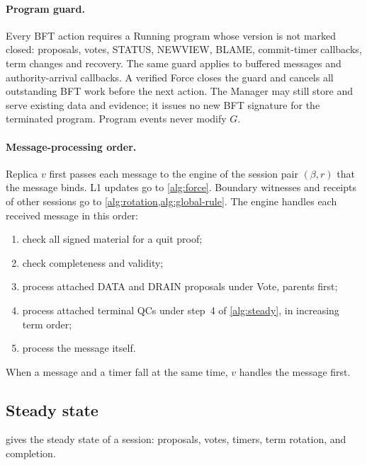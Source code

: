 \documentclass[11pt,a4paper]{article}
\newcommand{\RR}[1]{{\color{rrRed}#1}}
\begin{document}
\paragraph{Program guard.}
Every BFT action requires a Running program whose version is not marked
closed: proposals, votes, STATUS, NEWVIEW, BLAME, commit-timer callbacks,
term changes and recovery. The same guard applies to buffered messages
and authority-arrival callbacks. A verified Force closes the guard and
cancels all outstanding BFT work before the next action. The Manager may
still store and serve existing data and evidence; it issues no new BFT
signature for the terminated program. Program events never modify $G$.

\paragraph{Message-processing order.}\leavevmode
\RR{Replica $v$ first passes each message to the engine of the session
pair $(\beta,r)$ that the message binds. L1 updates go to \cref{alg:force}. Boundary witnesses and receipts of
other sessions go to \cref{alg:rotation,alg:global-rule}.} The engine handles each received
message in this order:
\begin{enumerate}[label=(\arabic*)]
\item check all signed material for a quit proof;
\item check completeness and validity;
\item process attached DATA \RR{and DRAIN} proposals under Vote, parents
first;
\item process attached terminal QCs under step~4 of \cref{alg:steady},
in increasing term order;
\item process the message itself.
\end{enumerate}
When a message and a timer fall at the same time, $v$ handles the
message first.

\subsection{Steady state}
\label{sec:steady}
 gives the steady state of a session: proposals, votes,
timers, term rotation, and completion.
\end{document}
